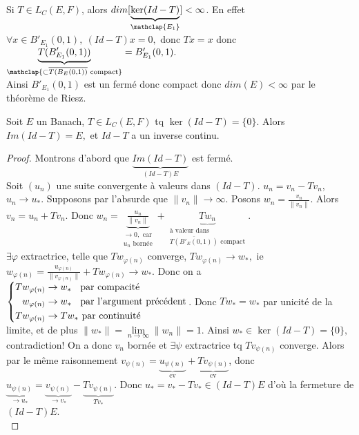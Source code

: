 \begin{remarque}
    Si $T\in L_C(E,F)$, alors $dim[\underbrace{\ker(Id-T)}_{\mathclap{E_1}}]<\infty $. En effet $\forall x\in B'_{E_1}(0,1),\ (Id-T)x=0, $ donc $Tx=x$ donc $\underbrace{T(B'_{E_1}(0,1))}_{\mathclap{\subset \overline{T(B_E(0,1))}\text{ compact}}}=B'_{E_1}(0,1).$ \\
    Ainsi $B'_{E_1}(0,1)$ est un fermé donc compact donc $dim(E)<\infty $ par le théorème de Riesz.
\end{remarque}
\begin{theoreme}
    Soit $E$ un Banach, $T\in L_C(E,F)$ tq $\ker(Id-T)=\{0\} .$ Alors $Im(Id-T)=E,$ et $Id-T$ a un inverse continu.
\end{theoreme}
\begin{proof}
    Montrons d'abord que $\underbrace{Im(Id-T)}_{(Id-T)E}$ est fermé.\\
    Soit $(u_n)$ une suite convergente à valeurs dans $(Id-T)$. $u_n=v_n-Tv_n$, $u_n\to u_*.$ Supposons par l'absurde que $\|v_n\|\to \infty .$ Posons $w_n=\frac{v_n}{\|v_n\|}.$ Alors $v_n=u_n+Tv_n.$ Donc $w_n=\underbrace{\frac{u_n}{\|v_n\|}}_{\substack{\to 0,\text{ car}\\u_n\text{ bornée}}}+\underbrace{Tw_n}_{\substack{\text{à valeur dans}\\\text{$\overline{T(B'_E(0,1))}$ compact}}}$.\\
    $\exists \varphi  $ extractrice, telle que $Tw_{\varphi (n)}$ converge, $Tw_{\varphi (n)}\to w_*,$ ie $w_{\varphi (n)}=\frac{u_{\varphi (n)}}{\|v_{\varphi (n)}\|}+Tw_{\varphi (n)}\to w_*.$ Donc on a
     $\left\{\begin{aligned}
             Tw_{\varphi (n)}&\to w_*\hspace{0.9em} \text{par compacité}\\
             w_{\varphi (n)}&\to w_* \hspace{0.9em} \text{par l'argument précédent}\\
         Tw_{\varphi (n)} &\to Tw_* \ \text{par continuité}
    \end{aligned}\right.$.
Donc $Tw_*=w_*$ par unicité de la limite, et de plus $\|w_*\|=\lim\limits_{n \to \infty} \|w_n\|=1.$ Ainsi $w_*\in \ker(Id-T)=\{0\} ,$ contradiction! On a donc $v_n$ bornée et $\exists \psi$ extractrice tq $Tv_{\psi(n)}$ converge. Alors par le même raisonnement $v_{\psi(n)}=\underbrace{u_{\psi(n)}}_{\text{cv}}+\underbrace{Tv_{\psi(n)}}_{\text{cv}}$, donc $\underbrace{u_{\psi(n)}}_{\to u_*}=\underbrace{v_{\psi(n)}}_{\to v_*}-\underbrace{Tv_{\psi(n)}}_{Tv_*}.$ Donc $u_*=v_*-Tv_*\in (Id-T)E$ d'où la fermeture de $(Id-T)E$.\\

\end{proof}
